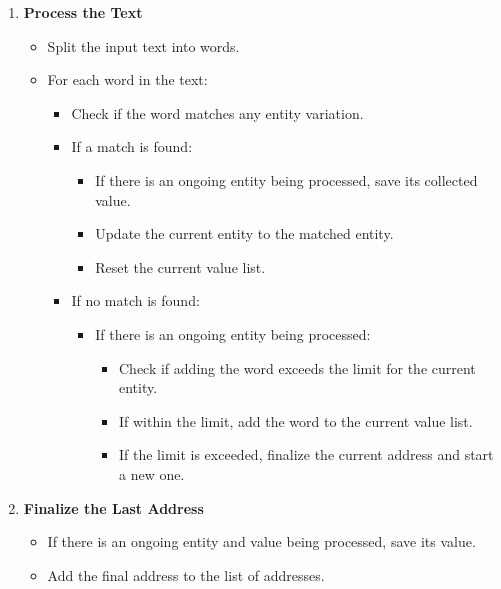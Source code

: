 \documentclass{solutionclass} %
\begin{document}
\begin{solution}
\begin{enumerate}
    \item \textbf{Process the Text}
    \begin{itemize}
        \item Split the input text into words.
        \item For each word in the text:
        \begin{itemize}
            \item Check if the word matches any entity variation.
            \item If a match is found:
            \begin{itemize}
                \item If there is an ongoing entity being processed, save its collected value.
                \item Update the current entity to the matched entity.
                \item Reset the current value list.
            \end{itemize}
            \item If no match is found:
            \begin{itemize}
                \item If there is an ongoing entity being processed:
                \begin{itemize}
                    \item Check if adding the word exceeds the limit for the current entity.
                    \item If within the limit, add the word to the current value list.
                    \item If the limit is exceeded, finalize the current address and start a new one.
                \end{itemize}
            \end{itemize}
        \end{itemize}
    \end{itemize}

    \item \textbf{Finalize the Last Address}
    \begin{itemize}
        \item If there is an ongoing entity and value being processed, save its value.
        \item Add the final address to the list of addresses.
    \end{itemize}


\end{enumerate}
\end{solution}
\end{document}

